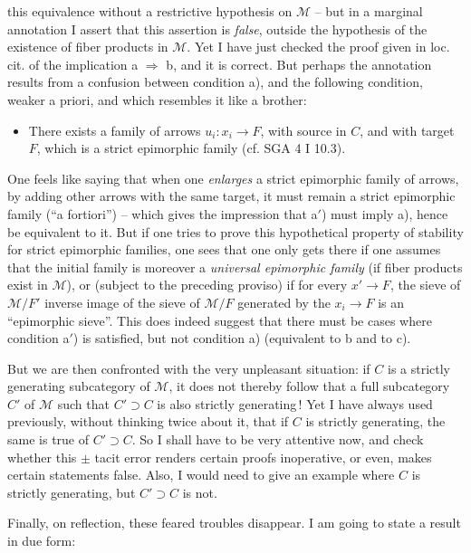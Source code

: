 \documentclass[11pt]{article}
\newcommand{\printedpage}[1]{\marginpar{\footnotesize p.~#1}}
\newcommand{\msp}[1]{\marginpar{\footnotesize [#1]}}
\begin{document}
this equivalence without a restrictive hypothesis on $\mathcal{M}$ – but in a marginal annotation I assert that this assertion is \textit{false}, outside the hypothesis of the existence of fiber products in $\mathcal{M}$. Yet I have just checked the proof given in loc. cit. of the implication a $\Longrightarrow$ b, and it is correct. But perhaps the annotation results from a confusion between condition a), and the following condition, weaker a priori, and which resembles it like a brother:
\begin{itemize}[label={}]
\item[a$'$)] There exists a family of arrows $u_i : x_i \longrightarrow F$, with source in $C$, and with target $F$, which is a strict epimorphic family (cf. SGA 4 I 10.3).
\end{itemize}
One feels like saying that when one \textit{enlarges} a strict epimorphic family of arrows, by adding other arrows with the same target, it must remain a strict epimorphic family (``a fortiori'') – which gives the impression that a$'$) must imply a), hence be equivalent to it. But if one tries to prove this hypothetical property %
\printedpage{66}
\msp{page 190}
of stability for strict epimorphic families, one sees that one only gets there if one assumes that the initial family is moreover a \textit{universal epimorphic family} (if fiber products exist in $\mathcal{M}$), or (subject to the preceding proviso) if for every $x' \longrightarrow F$, the sieve of $\mathcal{M}/F'$ inverse image of the sieve of $\mathcal{M}/F$ generated by the $x_i \longrightarrow F$ is an ``epimorphic sieve''. This does indeed suggest that there must be cases where condition a$'$) is satisfied, but not condition a) (equivalent to b and to c).

But we are then confronted with the very unpleasant situation: if $C$ is a strictly generating subcategory of $\mathcal{M}$, it does not thereby follow that a full subcategory $C'$ of $\mathcal{M}$ such that $C' \supset C$ is also strictly generating\,! Yet I have always used previously, without thinking twice about it, that if $C$ is strictly generating, the same is true of $C' \supset C$. So I shall have to be very attentive now, %
\msp{page 191}
and check whether this $\pm$ tacit error renders certain proofs inoperative, or even, makes certain statements false. Also, I would need to give an example where $C$ is strictly generating, but $C' \supset C$ is not.

Finally, on reflection, these feared troubles disappear. I am going to state a result in due form:
\end{document}
